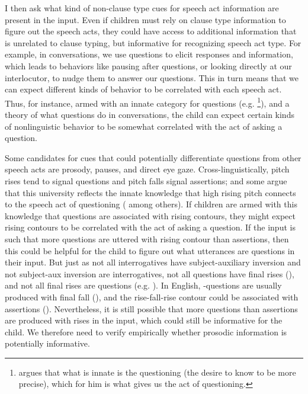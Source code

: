 I then %
ask what kind of non-clause type cues for speech act information are present in the input. Even if children must rely on clause type information to figure out the speech acts, they could have access to additional information that is unrelated to clause typing, but informative for recognizing speech act type. For example, in conversations, we use questions to elicit responses and information, which leads to behaviors like pausing after questions, or looking directly at our interlocutor, to nudge them to answer our questions. 
This in turn means that we can expect different kinds of behavior to be correlated with each speech act. Thus, for instance, armed with an innate category for questions (e.g. \cite{carruthers2018q}\footnote{\textcite{carruthers2018q} argues that what is innate is the questioning  (the desire to know to be more precise), which for him is what gives us the act of questioning.  }), and a theory of what questions do in conversations, the child can expect certain kinds of nonlinguistic behavior to be somewhat correlated with the act of asking a question. 

Some candidates for cues that could potentially differentiate questions from other speech acts are prosody, pauses, and direct eye gaze. Cross-linguistically, pitch rises tend to signal questions and pitch falls signal assertions; and some argue that this university reflects the innate knowledge that high rising pitch connects to the speech act of questioning (\cite{ohala1984,gussenhovenchen2000,gussenhoven2002} among others). If children are armed with this knowledge that questions are associated with rising contours, they might expect rising contours to be correlated with the act of asking a question. If the input is such that more questions are uttered with rising contour than assertions, then this could be helpful for the child to figure out what utterances are  questions in their input. But just as not all interrogatives have subject-auxiliary inversion and not subject-aux inversion are interrogatives, not all questions have final rises (\cite{gussenhoven2000fallq, hedberg2004wh,ladd2008intonational}), and not all final rises are questions (e.g. \cite{gordon1999prosody,ladd1981, ward1985rfr,goodhue2016prosody}). In English, \twh-questions are usually produced with final fall (\cite{hedberg2004wh,ladd2008intonational}), and the rise-fall-rise contour could be associated with assertions (\cite{ladd1981, ward1985rfr,goodhue2016prosody}). Nevertheless, it is still possible that more questions than assertions are produced with rises in the input, which could still be informative for the child. We therefore need to verify empirically whether prosodic information is potentially informative.

